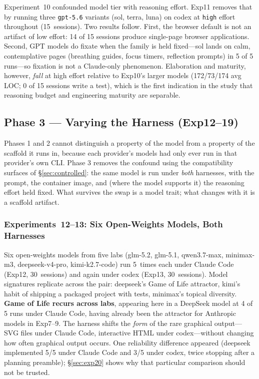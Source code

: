 \documentclass{article}
\begin{document}
Experiment~10 confounded model tier with reasoning effort. Exp11
removes that by running three \texttt{gpt-5.6} variants (sol,
terra, luna) on codex at \texttt{high} effort throughout
(15~sessions). Two results follow. First, the browser default is
not an artifact of low effort: 14 of 15 sessions produce
single-page browser applications. Second, GPT models do fixate
when the family is held fixed---sol lands on calm, contemplative
pages (breathing guides, focus timers, reflection prompts) in 5 of
5 runs---so fixation is not a Claude-only phenomenon. Elaboration
and maturity, however, \emph{fall} at high effort relative to
Exp10's larger models (172/73/174 avg LOC; 0 of 15 sessions write
a test), which is the first indication in the study that reasoning
budget and engineering maturity are separable.

\subsection{Phase 3 --- Varying the Harness (Exp12--19)}
\label{sec:phase-harness}

Phases 1 and 2 cannot distinguish a property of the model from a
property of the scaffold it runs in, because each provider's models
had only ever run in that provider's own CLI. Phase 3 removes the
confound using the compatibility surfaces of
\S\ref{sec:controlled}: the same model is run under \emph{both}
harnesses, with the prompt, the container image, and (where the
model supports it) the reasoning effort held fixed. What survives
the swap is a model trait; what changes with it is a scaffold
artifact.

\subsubsection{Experiments~12--13: Six Open-Weights Models, Both Harnesses}
\label{sec:exp1213}

Six open-weights models from five labs (glm-5.2, glm-5.1,
qwen3.7-max, minimax-m3, deepseek-v4-pro, kimi-k2.7-code) run
5~times each under Claude Code (Exp12, 30~sessions) and again
under codex (Exp13, 30~sessions). Model signatures replicate
across the pair: deepseek's Game of Life attractor, kimi's habit
of shipping a packaged project with tests, minimax's topical
diversity. \textbf{Game of Life recurs across labs}, appearing
here in a DeepSeek model at 4 of 5 runs under Claude Code, having
already been the attractor for Anthropic models in Exp7--9. The
harness shifts the \emph{form} of the rare graphical output---SVG
files under Claude Code, interactive HTML under codex---without
changing how often graphical output occurs. One reliability
difference appeared (deepseek implemented 5/5 under Claude Code
and 3/5 under codex, twice stopping after a planning preamble);
\S\ref{sec:exp20} shows why that particular comparison should not
be trusted.
\end{document}
